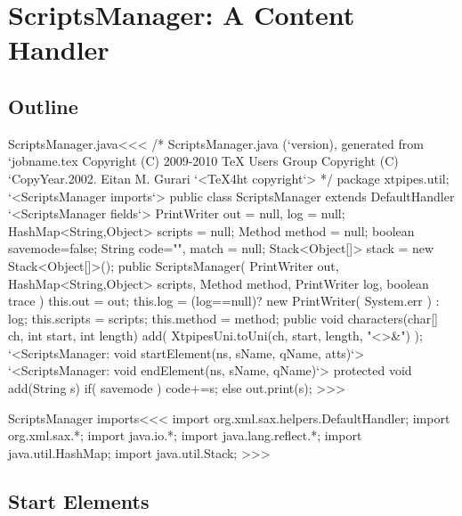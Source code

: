 \documentclass{article}
\begin{document}
\section{ScriptsManager: A Content Handler}

\label{ScriptsManager}


\subsection{Outline}



\<ScriptsManager.java\><<<
/* ScriptsManager.java (`version), generated from `jobname.tex
   Copyright (C) 2009-2010 TeX Users Group
   Copyright (C) `CopyYear.2002. Eitan M. Gurari
`<TeX4ht copyright`> */
package xtpipes.util;
`<ScriptsManager imports`>
public class ScriptsManager extends DefaultHandler {
     `<ScriptsManager fields`>
     PrintWriter out = null, log = null;
     HashMap<String,Object> scripts = null;
     Method method = null;
     boolean savemode=false;
     String code="", match = null;
     Stack<Object[]> stack = new Stack<Object[]>();
   public ScriptsManager( PrintWriter out,
                          HashMap<String,Object> scripts,
                          Method method,
                          PrintWriter log, boolean trace ){
     this.out = out;
     this.log = (log==null)? new PrintWriter( System.err ) : log;
     this.scripts = scripts;
     this.method = method;
   }
   public void characters(char[] ch, int start, int length){
     add( XtpipesUni.toUni(ch, start, length, "<>&") );
   }
   `<ScriptsManager: void startElement(ns, sName, qName, atts)`>
   `<ScriptsManager: void endElement(ns, sName, qName)`>
   protected void add(String s){
      if( savemode ){ code+=s; }
      else { out.print(s); }
}  }
>>>


\<ScriptsManager imports\><<<
import org.xml.sax.helpers.DefaultHandler;
import org.xml.sax.*;
import java.io.*;
import java.lang.reflect.*;
import java.util.HashMap;
import java.util.Stack;
>>>

\subsection{Start Elements}
\end{document}
